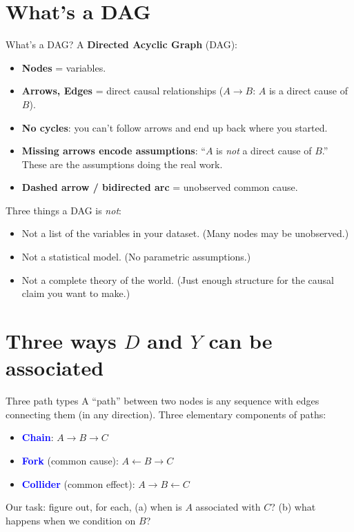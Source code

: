 \documentclass[xcolor=dvipsnames]{beamer}
\newcommand{\la}{\leftarrow}
\begin{document}
\section{What's a DAG}

\begin{frame}{What's a DAG?}
\small
A \textbf{Directed Acyclic Graph} (DAG):
\begin{itemize}
\footnotesize
\item<1-> \textbf{Nodes} = variables.
\item<2-> \textbf{Arrows, Edges} = direct causal relationships ($A \to B$: $A$ is a direct cause of $B$).
\item<3-> \textbf{No cycles}: you can't follow arrows and end up back where you started.
\item<4-> \textbf{Missing arrows encode assumptions}: ``$A$ is \textit{not} a direct cause of $B$.''  These are the assumptions doing the real work.
\item<5-> \textbf{Dashed arrow / bidirected arc} = unobserved common cause.
\end{itemize}

\bigskip
{} Three things a DAG is \textit{not}:
\begin{itemize}
\footnotesize
\item Not a list of the variables in your dataset.  (Many nodes may be unobserved.)
\item Not a statistical model.  (No parametric assumptions.)
\item Not a complete theory of the world.  (Just enough structure for the causal claim you want to make.)
\end{itemize}
\end{frame}


\section{Three ways $D$ and $Y$ can be associated}

\begin{frame}{Three path types}
\small
A ``path'' between two nodes is any sequence with edges connecting them (in any direction). Three elementary components of paths:

\bigskip
{}
\begin{itemize}
\item \textcolor{Blue}{\textbf{Chain}}: $A \to B \to C$
\medskip
\item \textcolor{Blue}{\textbf{Fork}} (common cause): $A \la B \to C$
\medskip
\item \textcolor{Blue}{\textbf{Collider}} (common effect): $A \to B \la C$
\end{itemize}

\bigskip
{} Our task: figure out, for each, (a) when is $A$ associated with $C$?  (b) what happens when we condition on $B$?
\end{frame}
\end{document}
